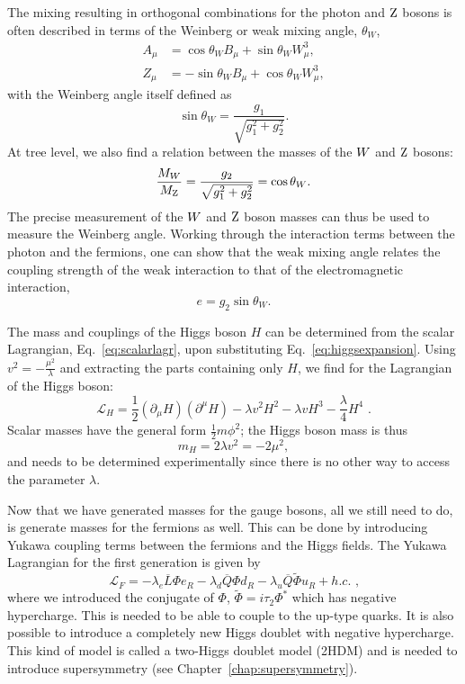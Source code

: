 The mixing resulting in orthogonal combinations for the photon and $\mathrm{Z}$ bosons is often described
in terms of the Weinberg or weak mixing angle, $\theta_W$,
\begin{align}
  A_\mu &=  \cos \theta_W B_\mu + \sin \theta_W W_\mu^3,\\
  Z_\mu &=  - \sin \theta_W B_\mu + \cos \theta_W W_\mu^3, 
\end{align}
with the Weinberg angle itself defined as
\begin{equation}
  \sin \theta_W = \frac{g_1}{\sqrt{g_1^2 + g_2^2}} .
\end{equation}
At tree level, we also find a relation between the masses of the $W$ and $\mathrm{Z}$ bosons: 
\begin{equation}
  \frac{M_{W}}{M_{\mathrm{Z}}} = \frac{g_2}{\sqrt{g_1^2 + g_2^2}} = \cos \theta_W . 
\end{equation}
The precise measurement of the $W$ and $\mathrm{Z}$ boson masses can thus be used to measure the Weinberg
angle.
Working through the interaction terms between the photon and the fermions, one can show that the
weak mixing angle relates the coupling strength of the weak interaction to that of the
electromagnetic interaction, 
\begin{equation}
  e = g_2 \sin \theta_W .
\end{equation}

The mass and
couplings of the Higgs boson $H$ can be determined from the scalar Lagrangian,
Eq.~\ref{eq:scalarlagr}, upon substituting Eq.~\ref{eq:higgsexpansion}. 
Using $v^2 = -\frac{\mu^2}{\lambda}$ and extracting the parts containing only $H$, we find for the
Lagrangian of the Higgs boson:
\begin{equation}
  \mathcal{L}_H = \frac{1}{2} (\partial_\mu H)(\partial^\mu H) - \lambda v^2 H^2 - \lambda v H^3 -
\frac{\lambda}{4} H^4 \textrm{ .}
\end{equation}
Scalar masses have the general form $\frac{1}{2} m \phi^2$; the Higgs boson mass is thus
\begin{equation}
m_H =  2 \lambda v^2 = - 2 \mu^2,
\end{equation}
and needs to be determined experimentally since there is no other way to access the parameter
$\lambda$. 

Now that we have generated masses for the gauge bosons, all we still need to do, is
generate masses for the fermions as well. This can be done by introducing Yukawa coupling terms
between the fermions and the Higgs fields. 
The Yukawa Lagrangian for the first generation is given by
\begin{equation}
  \mathcal{L}_F = - \lambda_e \overline{L} \Phi e_R - \lambda_d \overline{Q} \Phi d_R - \lambda_u
\overline{Q} \widetilde{\Phi} u_R + h.c. \textrm{ ,}
  \label{eq:Lag_Yuk}
\end{equation}
where we introduced the conjugate of $\Phi$, $\widetilde{\Phi} = i \tau_2 \Phi^*$ which has negative
hypercharge. This is needed to be able to couple to the up-type quarks. It is also possible to
introduce a completely new Higgs doublet with negative hypercharge. This kind of model is called a
two-Higgs doublet model (2HDM) and is needed to introduce supersymmetry (see
Chapter~\ref{chap:supersymmetry}). 

